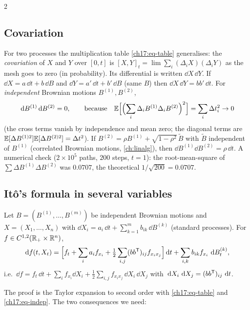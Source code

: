 \begin{paracol}{2}
\subsection{Covariation}
For two processes the multiplication table \eqref{ch17:eq-table} generalises: the \emph{covariation} of $X$ and $Y$ over $[0,t]$ is $[X,Y]_t=\lim\sum_i(\Delta_iX)(\Delta_iY)$ as the mesh goes to zero (in probability). Its differential is written
$\dd X\,\dd Y$. If $\dd X=a\,\dd t+b\,\dd B$ and $\dd Y=a'\,\dd t+b'\,\dd B$ (same $B$) then $\dd X\,\dd Y=bb'\,\dd t$.
For \emph{independent} Brownian motions $B^{(1)},B^{(2)}$,
\begin{equation}\label{ch17:eq-indep}
  \,\mathrm{d} B^{(1)}\,\mathrm{d} B^{(2)}=0 ,\qquad\text{because}\quad \mathbb{E}\Bigl[\Bigl(\sum_i\Delta_iB^{(1)}\Delta_iB^{(2)}\Bigr)^2\Bigr]=\sum_i\Delta t_i^2\to0
\end{equation}
(the cross terms vanish by independence and mean zero; the diagonal terms are $\mathbb{E}[\Delta B^{(1)2}]\mathbb{E}[\Delta B^{(2)2}]=\Delta t^2$). If $B^{(2)}=\rho B^{(1)}+\sqrt{1-\rho^2}\,\widetilde B$ with $\widetilde B$ independent of $B^{(1)}$ (correlated Brownian motions, \cref{ch:linalg}), then $\dd B^{(1)}\dd B^{(2)}=\rho\,\dd t$.
A numerical check ($2\times10^5$ paths, $200$ steps, $t=1$): the root-mean-square of $\sum\Delta B^{(1)}\Delta B^{(2)}$ was $0.0707$, the theoretical $1/\sqrt{200}=0.0707$.

\subsection{It\^o's formula in several variables}
\begin{theorem}\label{ch17:thm-multi}
Let $B=(B^{(1)},\dots,B^{(m)})$ be independent Brownian motions and $X=(X_1,\dots,X_n)$ with $\dd X_i=a_i\,\dd t+\sum_{k=1}^mb_{ik}\,\dd B^{(k)}$ (standard processes). For $f\in C^{1,2}(\mathbb{R}_+\times\mathbb{R}^n)$,
\begin{equation}\label{ch17:eq-multi}
  \,\mathrm{d} f(t,X_t)=\Bigl[f_t+\sum_ia_if_{x_i}+\tfrac12\sum_{i,j}(bb^{\mathsf T})_{ij}f_{x_ix_j}\Bigr]\,\mathrm{d} t+\sum_{i,k}b_{ik}f_{x_i}\,\,\mathrm{d} B^{(k)}_t ,
\end{equation}
i.e.\ $\dd f=f_t\,\dd t+\sum_if_{x_i}\dd X_i+\tfrac12\sum_{i,j}f_{x_ix_j}\,\dd X_i\,\dd X_j$ with $\,\mathrm{d} X_i\,\,\mathrm{d} X_j=(bb^{\mathsf T})_{ij}\,\,\mathrm{d} t$.
\end{theorem}
The proof is the Taylor expansion to second order with \eqref{ch17:eq-table} and \eqref{ch17:eq-indep}. The two consequences we need:


\end{paracol}
